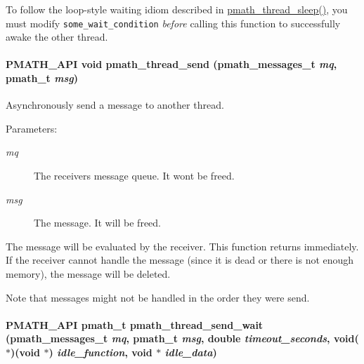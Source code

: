 To follow the loop-style waiting idiom described in \hyperlink{group__threadmsg_gce6da6e34b0aeab35094ddccdd9a3e55}{pmath\_\-thread\_\-sleep()}, you must modify {\tt some\_\-wait\_\-condition} {\em before\/} calling this function to successfully awake the other thread. \hypertarget{group__threadmsg_ga3867a708fb07b86e017e8f201ef7edd}{
\paragraph[{pmath\_\-thread\_\-send}]{\setlength{\rightskip}{0pt plus 5cm}PMATH\_\-API void pmath\_\-thread\_\-send ({\bf pmath\_\-messages\_\-t} {\em mq}, \/  {\bf pmath\_\-t} {\em msg})}\hfill}
\label{group__threadmsg_ga3867a708fb07b86e017e8f201ef7edd}


Asynchronously send a message to another thread. 

\begin{Desc}
\item[Parameters:]
\begin{description}
\item[{\em mq}]The receivers message queue. It wont be freed. \item[{\em msg}]The message. It will be freed.\end{description}
\end{Desc}
The message will be evaluated by the receiver. This function returns immediately. If the receiver cannot handle the message (since it is dead or there is not enough memory), the message will be deleted.

Note that messages might not be handled in the order they were send. \hypertarget{group__threadmsg_g4ce8afcfec001a88441bdf8b50bcd157}{
\paragraph[{pmath\_\-thread\_\-send\_\-wait}]{\setlength{\rightskip}{0pt plus 5cm}PMATH\_\-API {\bf pmath\_\-t} pmath\_\-thread\_\-send\_\-wait ({\bf pmath\_\-messages\_\-t} {\em mq}, \/  {\bf pmath\_\-t} {\em msg}, \/  double {\em timeout\_\-seconds}, \/  void($\ast$)(void $\ast$) {\em idle\_\-function}, \/  void $\ast$ {\em idle\_\-data})}\hfill}
\label{group__threadmsg_g4ce8afcfec001a88441bdf8b50bcd157}


